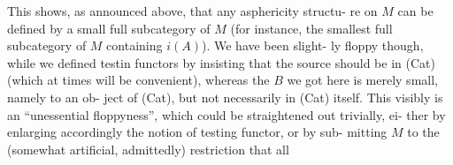  This shows, as announced above, that any asphericity structu-%
re on $M$ can be defined by a small full subcategory of $M$ (for instance,
the smallest full subcategory of $M$ containing $i(A)$). We have been slight-%
ly floppy though, while we defined testin functors  by insisting
that the source should be in (Cat) (which at times will be convenient),
whereas the $B$ we got here is merely small, namely \hand{\uline{\textcolor{black}{isomorphic}}} to an ob-%
ject of (Cat), but not necessarily in (Cat) itself. This visibly is an
``unessential floppyness'', which could be straightened out trivially, ei-%
ther by enlarging accordingly the notion of testing functor, or by sub-%
mitting $M$ to the (somewhat artificial, admittedly) restriction that all

